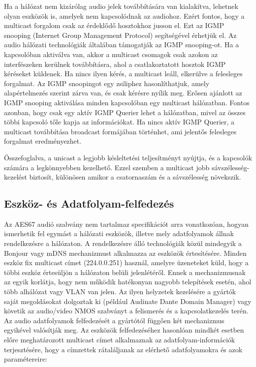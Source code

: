 Ha a hálózat nem kizárólag audio jelek továbbítására van kialakítva, lehetnek olyan
eszközök is, amelyek nem kapcsolódnak az audiohoz. Ezért fontos, hogy a multicast
forgalom csak az érdeklődő hosztokhoz jusson el. Ezt az IGMP snooping (Internet
Group Management Protocol) segítségével érhetjük el. Az audio hálózati technológiák
általában támogatják az IGMP snooping-ot. Ha a kapcsolóban aktiválva van, akkor a
multicast csomagok csak azokon az interfészeken kerülnek továbbításra, ahol a
csatlakoztatott hosztok IGMP kéréseket küldenek. Ha nincs ilyen kérés, a multicast
leáll, elkerülve a felesleges forgalmat. Az IGMP snoopingot egy zsiliphez hasonlíthatjuk,
amely alapértelmezés szerint zárva van, és csak kérésre nyílik meg. Erősen ajánlott
az IGMP snooping aktiválása minden kapcsolóban egy multicast hálózatban. Fontos
azonban, hogy csak egy aktív IGMP Querier lehet a hálózatban, mivel az összes többi
kapcsoló tőle kapja az információkat. Ha nincs aktív IGMP Querier, a multicast
továbbítása broadcast formájában történhet, ami jelentős felesleges forgalmat
eredményezhet.

Összefoglalva, a unicast a legjobb késleltetési teljesítményt nyújtja, és a
kapcsolók számára a legkönnyebben kezelhető. Ezzel szemben a multicast jobb
sávszélesség-kezelést biztosít, különösen amikor a csatornaszám és a sávszélesség
növekszik.


\subsection{Eszköz- és Adatfolyam-felfedezés}

Az AES67 audió szabvány nem tartalmaz specifikációt arra vonatkozóan, hogyan
ismerhetik fel egymást a hálózati eszközök, illetve mely adatfolyamok állnak
rendelkezésre a hálózaton. A rendelkezésre álló technológiák közül mindegyik a
Bonjour vagy mDNS mechanizmust alkalmazza az eszközök értesítésére. Minden eszköz
fix multicast címet (224.0.0.251) használ, amelyre üzeneteket küld, hogy a
többi eszköz értesüljön a hálózaton belüli jelenlétéről. Ennek a mechanizmusnak
az egyik korlátja, hogy nem működik hatékonyan nagyobb telepítések esetén, ahol
több alhálózat vagy VLAN van jelen. Az ilyen helyzetek kezelésére a gyártók
saját megoldásokat dolgoztak ki (például Audinate Dante Domain Manager) vagy
követik az audio/video NMOS szabványt a felismerés és a kapcsolatkezelés terén.
Az audio adatfolyamok felfedezését a gyártótól függően két mechanizmus egyikével
valósítják meg. Az eszközök felfedezéséhez hasonlóan mindkét esetben előre
meghatározott multicast címet alkalmaznak az adatfolyam-információk
terjesztésére, hogy a címzettek rátaláljanak az elérhető adatfolyamokra és azok
paramétereire:


